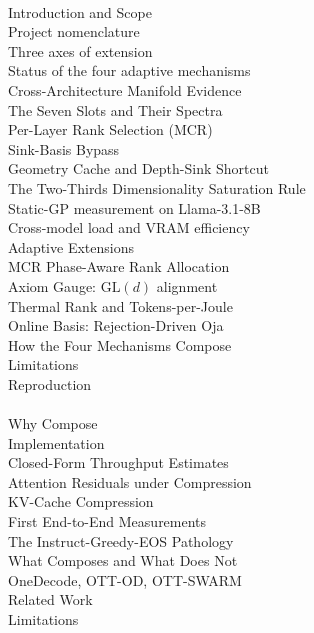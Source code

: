 \documentclass[11pt]{article}
\begin{document}
\vspace{6pt}
\\
\quad Introduction and Scope\\
\quad \quad Project nomenclature\\
\quad \quad Three axes of extension\\
\quad \quad Status of the four adaptive mechanisms\\
\quad Cross-Architecture Manifold Evidence\\
\quad The Seven Slots and Their Spectra\\
\quad Per-Layer Rank Selection (MCR)\\
\quad \quad Sink-Basis Bypass\\
\quad Geometry Cache and Depth-Sink Shortcut\\
\quad \quad The Two-Thirds Dimensionality Saturation Rule\\
\quad Static-GP measurement on Llama-3.1-8B\\
\quad \quad Cross-model load and VRAM efficiency\\
\quad Adaptive Extensions\\
\quad \quad MCR Phase-Aware Rank Allocation\\
\quad \quad Axiom Gauge: $\mathrm{GL}(d)$ alignment\\
\quad \quad Thermal Rank and Tokens-per-Joule\\
\quad \quad Online Basis: Rejection-Driven Oja\\
\quad How the Four Mechanisms Compose\\
\quad Limitations\\
\quad Reproduction\\

\vspace{6pt}
\\
\quad Why Compose\\
\quad Implementation\\
\quad Closed-Form Throughput Estimates\\
\quad Attention Residuals under Compression\\
\quad KV-Cache Compression\\
\quad First End-to-End Measurements\\
\quad \quad The Instruct-Greedy-EOS Pathology\\
\quad What Composes and What Does Not\\
\quad OneDecode, OTT-OD, OTT-SWARM\\
\quad Related Work\\
\quad Limitations\\
\end{document}
